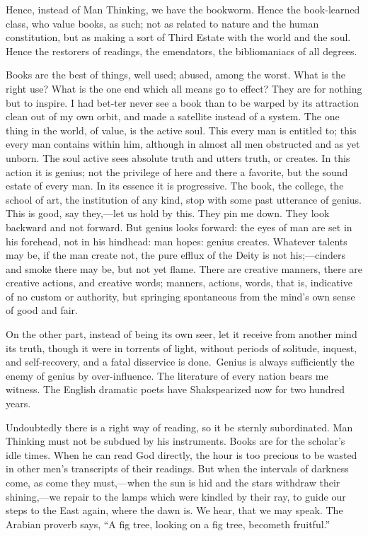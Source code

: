 Hence, instead of Man Thinking, we have the bookworm. Hence the
book-learn\-ed class, who value books, as such; not as related to
nature and the human constitution, but as making a sort of Third
Estate with the world and the soul. Hence the restorers of readings,
the emendators, the bibliomaniacs of all degrees.

Books are the best of things, well used; abused, among the worst. What
is the right use? What is the one end which all means go to effect?
They are for nothing but to inspire. I had bet-ter never see
a book than to be warped by its attraction clean out of my own orbit,
and made a satellite instead of a system. The one thing in the world,
of value, is the active soul. This every man is entitled to; this
every man contains within him, although in almost all men obstructed
and as yet unborn. The soul active sees absolute truth and utters
truth, or creates. In this action it is genius; not the privilege of
here and there a favorite, but the sound estate of every man. In its
essence it is progressive. The book, the college, the school of art,
the institution of any kind, stop with some past utterance of genius.
This is good, say they,---let us hold by this. They pin me down. They
look backward and not forward. But genius looks forward: the eyes of
man are set in his forehead, not in his hindhead: man hopes: genius
creates. Whatever talents may be, if the man create not, the pure
efflux of the Deity is not his;---cin\-ders and smoke there may be,
but not yet flame. There are creative manners, there are creative
actions, and creative words; manners, actions, words, that is,
indicative of no custom or authority, but springing spontaneous from
the mind's own sense of good and fair.

On the other part, instead of being its own  seer, let it
receive from another mind its truth, though it were in torrents of
light, without periods of solitude, inquest, and self-recovery, and a
fatal disservice is done. Genius is always sufficiently the enemy of
genius by over-influence. The literature of every nation bears me
witness. The English dramatic poets have Shakspearized now for two
hundred years.

Undoubtedly there is a right way of reading, so it be sternly
subordinated. Man Thinking must not be subdued by his instruments.
Books are for the scholar's idle times. When he can read God directly,
the hour is too precious to be wasted in other men's transcripts of
their readings. But when the intervals of darkness come, as come they
must,---when the sun is hid and the stars withdraw their
shin\-ing,---we repair to the lamps which were kindled by their ray,
to guide our steps to the East again, where the dawn is. We hear, that
we may speak. The Arabian proverb says, ``A fig tree, looking on a fig
tree, becometh fruitful.''

